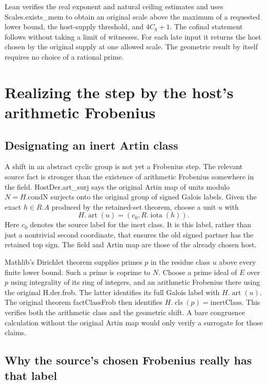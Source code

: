 \documentclass[12pt,letterpaper]{article}
\DeclareRobustCommand{\id}[1]{\mbox{\small\ttfamily #1}}
\begin{document}
Lean verifies the real exponent and natural ceiling estimates and uses \id{Scales.exists\_mem} to obtain an original scale above the maximum of a requested lower bound, the host-supply threshold, and \(4C_8+1\). The cofinal statement follows without taking a limit of witnesses. For each late input it returns the host chosen by the original supply at one allowed scale. The geometric result by itself requires no choice of a rational prime.

\section{Realizing the step by the host's arithmetic Frobenius}
\label{sec:artin}

\subsection{Designating an inert Artin class}

A shift in an abstract cyclic group is not yet a Frobenius step. The relevant source fact is stronger than the existence of arithmetic Frobenius somewhere in the field. \id{HostDer.art\_surj} says the original Artin map of units modulo \(N=H.\mathrm{condN}\) surjects onto the original group of signed Galois labels. Given the exact \(h\in R.A\) produced by the retained-set theorem, choose a unit \(u\) with
\[
                         H.\operatorname{art}(u)=(c_0,R.\operatorname{iota}(h)).
 \label{eq:artin-class}
\]
Here \(c_0\) denotes the source label for the inert class. It is this label, rather than just a nontrivial second coordinate, that ensures the old signed partner has the retained top sign. The field and Artin map are those of the already chosen host.

Mathlib's Dirichlet theorem supplies primes \(p\) in the residue class \(u\) above every finite lower bound. Such a prime is coprime to \(N\). Choose a prime ideal of \(E\) over \(p\) using integrality of its ring of integers, and an arithmetic Frobenius there using the original \id{H.der.frob}. The latter identifies its full Galois label with \(H.\operatorname{art}(u)\). The original theorem \id{factClassFrob} then identifies \(H.\operatorname{cls}(p)=\mathrm{inertClass}\). This verifies both the arithmetic class and the geometric shift. A bare congruence calculation without the original Artin map would only verify a surrogate for those claims.

\subsection{Why the source's chosen Frobenius really has that label}
\end{document}
